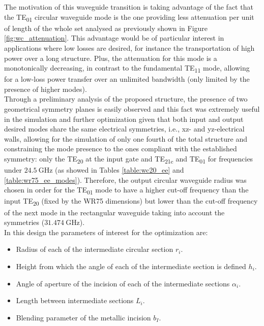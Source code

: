 \documentclass[english,twoside]{article}
\begin{document}
    The motivation of this waveguide transition is taking advantage of the fact that the \ac{TE}\textsubscript{01} circular waveguide mode is the one providing less attenuation per unit of length of the whole set analysed as previously shown in Figure \ref{fig:wc_attenuation}. This advantage would be of particular interest in applications where low losses are desired, for instance the transportation of high power over a long structure. Plus, the attenuation for this mode is a monotonically decreasing, in contrast to the fundamental \ac{TE}\textsubscript{11} mode, allowing for a low-loss power transfer over an unlimited bandwidth (only limited by the presence of higher modes). \\ 
    
    
    
    Through a preliminary analysis of the proposed structure, the presence of two geometrical symmetry planes is easily observed and this fact was extremely useful in the simulation and further optimization given that both input and output desired modes share the same electrical symmetries, i.e., xz- and yz-electrical walls, allowing for the simulation of only one fourth of the total structure and constraining the mode presence to the ones compliant with the established symmetry: only the \ac{TE}\textsubscript{20} at the input gate and \ac{TE}\textsubscript{21c} and \ac{TE}\textsubscript{01} for frequencies under $\SI{24.5}{\giga\hertz}$ (as showed in Tables \ref{table:wc20_ee} and \ref{table:wr75_ee_modes}). Therefore, the output circular waveguide radius was chosen in order for the \ac{TE}\textsubscript{01} mode to have a higher cut-off frequency than the input \ac{TE}\textsubscript{20} (fixed by the WR75 dimensions) but lower than the cut-off frequency of the next mode in the rectangular waveguide taking into account the symmetries ($\SI{31.474}{\giga\hertz}$).\\
                
    
    
    In this design the parameters of interest for the optimization are:
    \begin{itemize}
      \item Radius of each of the intermediate circular section $r_{i}$.
      \item Height from which the angle of each of the intermediate section is defined $h_{i}$.
      \item Angle of aperture of the incision of each of the intermediate sections $\alpha_{i}$.
      \item Length between intermediate sections $L_i$.
      \item Blending parameter of the metallic incision $b_I$.
    \end{itemize}      
	
\end{document}
